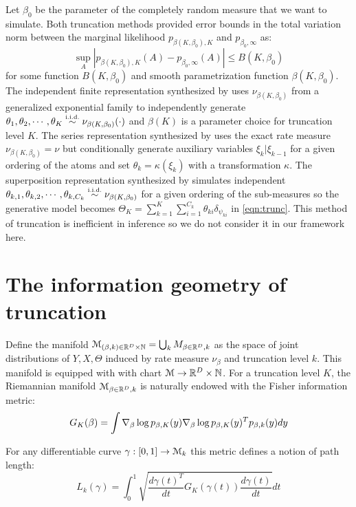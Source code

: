 \documentclass[letterpaper]{article}
\begin{document}
Let $\beta_0$ be the parameter of the completely random measure that we want to simulate. Both truncation methods provided error bounds in the total variation norm between the marginal likelihood $p_{\beta(K,\beta_0),K}$ and $p_{\beta_0,\infty}$ as:
\[
	\sup_A\left|p_{\beta(K,\beta_0),K}(A)-p_{\beta_0,\infty}(A)\right|\le B(K,\beta_0)
\]
for some function $B(K,\beta_0)$ and smooth parametrization function $\beta(K,\beta_0)$. The independent finite representation synthesized by \cite{nguyen20} uses $\nu_{\beta(K,\beta_0)}$ from a generalized exponential family \cite{broderick18} to independently generate $\theta_1,\theta_2,\cdots,\theta_K\distiid\nu_{\beta(K,\beta_0)}(\cdot)$ and $\beta(K)$ is a parameter choice for truncation level  $K$. The series representation synthesized by \cite{campbell19} uses the exact rate measure $\nu_{\beta(K,\beta_0)}=\nu$ but conditionally generate auxiliary variables $\xi_k|\xi_{k-1}$ for a given ordering of the atoms and set $\theta_k=\kappa(\xi_k)$ with a transformation $\kappa$. The superposition representation synthesized by \cite{campbell19} simulates independent $\theta_{k,1},\theta_{k,2},\cdots,\theta_{k,C_k}\distiid\nu_{\beta(K,\beta_0)}$ for a given ordering of the sub-measures so the generative model becomes $\Theta_K=\sum_{k=1}^K\sum_{i=1}^{C_k}\theta_{ki}\delta_{\psi_{ki}}$ in \ref{eqn:trunc}. This method of truncation is inefficient in inference \cite{zhu20,nguyen20} so we do not consider it in our framework here. 

\section{The information geometry of truncation}

Define the manifold $\mathcal{M}_{(\beta,k)\in\mathbb{R}^D\times\mathbb{N}}=\bigcup_k M_{\beta\in\mathbb{R}^D,k}$ as the space of  joint distributions of $Y,X,\Theta$ induced by rate measure $\nu_\beta$ and truncation level $k$. This manifold is equipped with with chart $\mathcal{M}\rightarrow\mathbb{R}^D\times\mathbb{N}$.  For a truncation level $K$, the Riemannian manifold $\mathcal{M}_{\beta\in\mathbb{R}^D,k}$ is naturally endowed with the Fisher information metric:
\[
	G_K(\beta)=\int\nabla_\beta\log p_{\beta,K}(y)\nabla_\beta\log p_{\beta,K}(y)^Tp_{\beta,k}(y)dy
\]

For any differentiable curve $\gamma:[0,1]\rightarrow\mathcal{M}_k$ this metric defines a notion of path length:
\[
	L_k(\gamma)=\int_0^1\sqrt{\frac{d\gamma(t)^T}{dt}G_K(\gamma(t))\frac{d\gamma(t)}{dt}}dt
\]



{
\small


}
\end{document}
